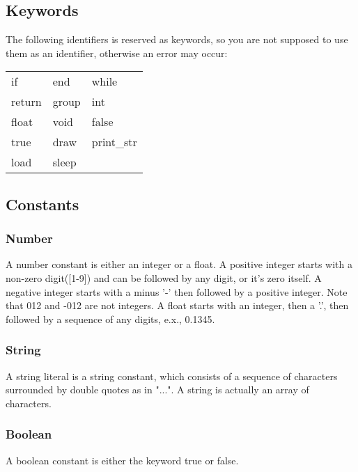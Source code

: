 \documentclass[11pt,letterpaper]{article}
\begin{document}
\subsection {Keywords}
The following identifiers is reserved as keywords, so you are not supposed to use them as an identifier, otherwise an error may occur:

\begin{center}
    \begin{tabular}{l l l}
		if 		& end 	& while \\
		return	& group	& int 	\\
		float	& void	& false	\\ 
		true		& draw	& print\_str		\\
		load		& sleep	&				\\
    \end{tabular}
\end{center}

\subsection {Constants}
\subsubsection {Number}
A number constant is either an integer or a float. A positive integer starts with a non-zero digit([1-9]) and can be followed by any digit, or it's zero itself. A negative integer starts with a minus '-' then followed by a positive integer. Note that 012 and -012 are not integers. A float starts with an integer, then a '.', then followed by a sequence of any digits, e.x., 0.1345.

\subsubsection {String}
A string literal is a string constant, which consists of a sequence of characters surrounded by double quotes as in "...". A string is actually an array of characters.

\subsubsection {Boolean}
A boolean constant is either the keyword true or false.
\end{document}
